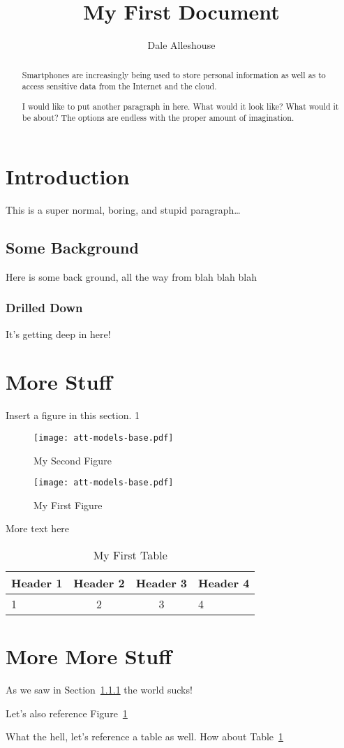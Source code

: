 \documentclass{article}
\title{My First Document} \author{Dale Alleshouse}
\begin{document}
 \maketitle

\begin{abstract}
    Smartphones are increasingly being used to store personal
    information as well as to access sensitive data from the Internet and the
    cloud.

    I would like to put another paragraph in here. What would it look like? What
    would it be about? The options are endless with the proper amount of
    imagination.
\end{abstract}

\section{Introduction} This is a super normal, boring, and stupid
paragraph\ldots

\subsection{Some Background} Here is some back ground, all the way from blah
blah blah

\subsubsection{Drilled Down}\label{sec:drilled-down} It's getting deep in here!

\newpage
\section{More Stuff}

Insert a figure in this section. 1

\begin{figure}
    \centering
    \texttt{[image: att-models-base.pdf]}
    \caption{My Second Figure}\label{fig:second-figure}
\end{figure}

\begin{figure}
    \centering
    \texttt{[image: att-models-base.pdf]}
    \caption{My First Figure}\label{fig:first-figure}
\end{figure}


More text here

\begin{table}
    \centering
    \begin{tabular}{lccp{}}
        \toprule
        Header 1    &   Header 2    &   Header 3    &   Header 4 \\
        \midrule
        1           &   2           &   3           &   4   \\
        \bottomrule
    \end{tabular}
    \caption{My First Table}\label{tab:first-table}
\end{table}

\section{More More Stuff}
As we saw in Section~\ref{sec:drilled-down} the world sucks!

Let's also reference Figure~\ref{fig:second-figure}

What the hell, let's reference a table as well. How about
Table~\ref{tab:first-table}


\end{document}
